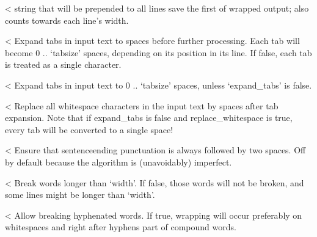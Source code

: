 \documentclass[letterpaper,10pt,english]{sphinxmanual}
\begin{document}
\begin{savenotes}
{{\begin{savenotes}
{{\begin{savenotes}
{{\begin{savenotes}
{{\begin{fulllineitems}
{{{\begin{description}
<%
string that will be prepended to all lines save the first
of wrapped output; also counts towards each line’s width.

<%
Expand tabs in input text to spaces before further processing.
Each tab will become 0 .. ‘tabsize’ spaces, depending on its position
in its line.  If false, each tab is treated as a single character.

<%
Expand tabs in input text to 0 .. ‘tabsize’ spaces, unless
‘expand\_tabs’ is false.

<%
Replace all whitespace characters in the input text by spaces
after tab expansion.  Note that if expand\_tabs is false and
replace\_whitespace is true, every tab will be converted to a
single space!

<%
Ensure that sentence\sphinxhyphen{}ending punctuation is always followed
by two spaces.  Off by default because the algorithm is
(unavoidably) imperfect.

<%
Break words longer than ‘width’.  If false, those words will not
be broken, and some lines might be longer than ‘width’.

<%
Allow breaking hyphenated words. If true, wrapping will occur
preferably on whitespaces and right after hyphens part of
compound words.


\end{description}}}}
\end{fulllineitems}}}
\end{savenotes}}}
\end{savenotes}}}
\end{savenotes}}}
\end{savenotes}
\end{document}
